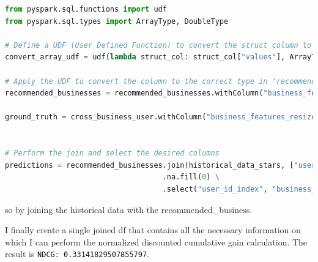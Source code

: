 \documentclass[12pt,english]{report}
\begin{document}
\begin{lstlisting}[language={Python},label={lst:predictiondf},caption={Build prediction df}]
from pyspark.sql.functions import udf
from pyspark.sql.types import ArrayType, DoubleType

# Define a UDF (User Defined Function) to convert the struct column to an array of double
convert_array_udf = udf(lambda struct_col: struct_col["values"], ArrayType(DoubleType()))

# Apply the UDF to convert the column to the correct type in 'recommended_businesses'
recommended_businesses = recommended_businesses.withColumn("business_features", convert_array_udf("business_features"))

ground_truth = cross_business_user.withColumn("business_features_resized", convert_array_udf("business_features_resized"))


# Perform the join and select the desired columns
predictions = recommended_businesses.join(historical_data_stars, ["user_id_index", "business_id_index"], how="inner") \
                                    .na.fill(0) \
                                    .select("user_id_index", "business_id_index", "business_features", "stars_review")
\end{lstlisting}
so by joining the historical data with the recommended\_business. \par
I finally create a single joined df that contains all the necessary information on which I can perform the normalized discounted cumulative gain calculation.
The result is \texttt{NDCG: 0.33141829507855797}.
\end{document}
